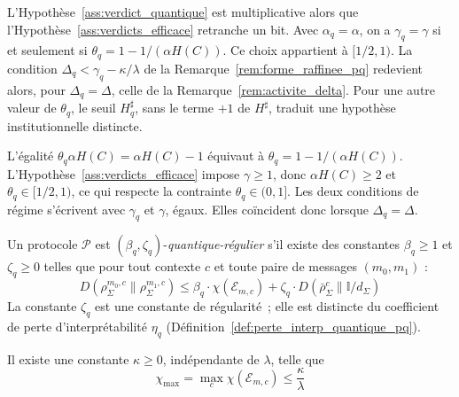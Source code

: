 \begin{sloppypar}
\begin{remark}
\label{rem:raccord_gamma_q}
L'Hypoth\`ese~\ref{ass:verdict_quantique} est multiplicative alors que
l'Hypoth\`ese~\ref{ass:verdicts_efficace} retranche un bit. Avec $\alpha_q = \alpha$,
on a $\gamma_q = \gamma$ si et seulement si $\theta_q = 1 - 1/(\alpha H(C))$. Ce choix
appartient \`a $[1/2, 1)$. La condition $\Delta_q < \gamma_q - \kappa/\lambda$ de la
Remarque~\ref{rem:forme_raffinee_pq} redevient alors, pour $\Delta_q = \Delta$, celle de la
Remarque~\ref{rem:activite_delta}. Pour une autre valeur de $\theta_q$, le seuil
$H^\sharp_q$, sans le terme $+1$ de $H^\sharp$, traduit une hypoth\`ese
institutionnelle distincte.
\end{remark}

\begin{Preuve}
L'\'egalit\'e $\theta_q\alpha H(C) = \alpha H(C) - 1$ \'equivaut \`a
$\theta_q = 1 - 1/(\alpha H(C))$. L'Hypoth\`ese~\ref{ass:verdicts_efficace} impose
$\gamma \geq 1$, donc $\alpha H(C) \geq 2$ et $\theta_q \in [1/2, 1)$, ce qui respecte la
contrainte $\theta_q \in (0,1]$. Les deux conditions de r\'egime s'\'ecrivent avec
$\gamma_q$ et $\gamma$, \'egaux. Elles co\"incident donc lorsque $\Delta_q = \Delta$.
\end{Preuve}

\begin{assumption}
\label{ass:regularite_quantique}
Un protocole $\mathcal{P}$ est $(\beta_q, \zeta_q)$-\emph{quantique-r\'egulier}
s'il existe des constantes $\beta_q \geq 1$ et $\zeta_q \geq 0$ telles que
pour tout contexte $c$ et toute paire de messages $(m_0, m_1)$ :
\begin{equation}
D(\rho_\Sigma^{m_0,c} \| \rho_\Sigma^{m_1,c}) \leq \beta_q \cdot \chi(\mathcal{E}_{m,c}) + \zeta_q \cdot D(\bar{\rho}_\Sigma^c \| \mathbb{I}/d_\Sigma)
\label{eq:regularite_quantique}
\end{equation}
La constante $\zeta_q$ est une constante de r\'egularit\'e~; elle est
distincte du coefficient de perte d'interpr\'etabilit\'e $\eta_q$
(D\'efinition~\ref{def:perte_interp_quantique_pq}).
\end{assumption}

\begin{assumption}
\label{ass:regime_quantique}
Il existe une constante $\kappa \geq 0$, ind\'ependante de $\lambda$,
telle que
\begin{equation}
\chi_{\max} = \max_c \chi(\mathcal{E}_{m,c}) \leq \frac{\kappa}{\lambda}
\label{eq:regime_quantique}
\end{equation}
\end{assumption}


\end{sloppypar}

